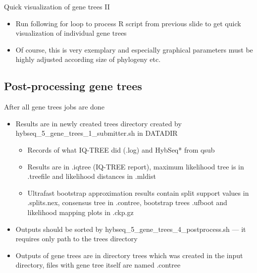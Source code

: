\documentclass[compress,  xelatex, 11pt, xcolor=x11names, aspectratio=169,
	hyperref={
		bookmarks=true,
		unicode=true,
		colorlinks=true,
		pdftitle={HybSeq course},
		plainpages=false,
		pdfauthor={Vojtech Zeisek},
		pdfsubject={Practical processing of HybSeq target enrichment sequencing data on computing grids like MetaCentrum},
		pdfcreator={XeLaTeX},
		pdfkeywords={BASH, command line, GNU, HybSeq, Linux, MetaCentrum, sequencing shell, target enrichment},
		linkcolor=Turquoise4, %
		anchorcolor=DodgerBlue4, %
		citecolor=DodgerBlue4, %
		filecolor=DodgerBlue4, %
		menucolor=Tan4, %
		urlcolor=DarkOliveGreen4 %
		},
	url={hyphens, lowtilde} %
	]{beamer}
\renewcommand{\texttt}[1]{\colorbox{Cornsilk2}{{\ttfamily #1}}}
\begin{document}
\begin{frame}[fragile]{Quick visualization of gene trees II}
	\begin{itemize}
		\item Run following \texttt{for} loop to process \texttt{R} script from previous slide to get quick visualization of individual gene trees
		\item Of course, this is very exemplary and especially graphical parameters must be highly adjusted according size of phylogeny etc.
	\end{itemize}
\end{frame}

\subsection{Post-processing gene trees}

\begin{frame}{After all gene trees jobs are done}
	\begin{itemize}
		\item Results are in newly created \texttt{trees} directory created by \texttt{hybseq\_5\_gene\_trees\_1\_submitter.sh} in \texttt{DATADIR}
		\begin{itemize}
			\item Records of what IQ-TREE did (\texttt{*.log}) and \texttt{HybSeq*} from \texttt{qsub}
			\item Results are in \texttt{*.iqtree} (IQ-TREE report), maximum likelihood tree is in \texttt{*.treefile} and likelihood distances in \texttt{*.mldist}
			\item Ultrafast bootstrap approximation results contain split support values in \texttt{*.splits.nex}, consensus tree in \texttt{*.contree}, bootstrap trees \texttt{*.ufboot} and likelihood mapping plots in \texttt{*.ckp.gz}
		\end{itemize}
		\item Outputs should be sorted by \texttt{hybseq\_5\_gene\_trees\_4\_postprocess.sh} --- it requires only path to the \texttt{trees} directory
		\item Outputs of gene trees are in directory \texttt{trees} which was created in the input directory, files with gene tree itself are named \texttt{*.contree}
	\end{itemize}
\end{frame}
\end{document}
